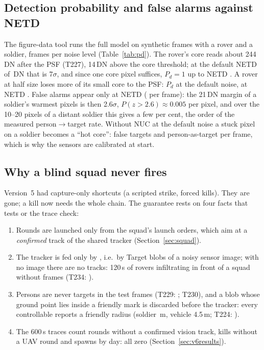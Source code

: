 \subsection{Detection probability and false alarms against NETD}
The figure-data tool runs the full model on synthetic frames with a rover and a soldier, \cvFrames{} frames per noise level (Table~\ref{tab:pd}). The rover's core reads about 244\,DN after the PSF (T227), 14\,DN above the core threshold; at the default NETD of \snNetdDn\,DN that is 7$\sigma$, and since one core pixel suffices, $P_d=1$ up to NETD \cvNetdWorst. A rover at half size loses more of its small core to the PSF: $P_d$ \cvPdFarNom{} at the default noise, \cvPdFarWorst{} at NETD \cvNetdWorst. False alarms appear only at NETD \cvNetdWorst{} (\cvFalseWorst{} per frame): the 21\,DN margin of a soldier's warmest pixels is then 2.6$\sigma$, $P(z>2.6)\approx0.005$ per pixel, and over the 10--20 pixels of a distant soldier this gives a few per cent, the order of the measured person$\to$target rate. Without NUC at the default noise a stuck pixel on a soldier becomes a ``hot core'': \cvNoNucFalse{} false targets and \cvNoNucPerson{} person-as-target per frame, which is why the sensors are calibrated at start.
\begin{table}[h]
\centering\small
\caption{Detection statistics against NETD (generated from , \cvFrames{} frames per row, after NUC except the last row).}\label{tab:pd}
\tabPd
\end{table}

\subsection{Why a blind squad never fires}
Version~5 had capture-only shortcuts (a scripted strike, forced kills). They are gone; a kill now needs the whole chain. The guarantee rests on four facts that tests or the trace check:
\begin{enumerate}
\item Rounds are launched only from the squad's launch orders, which aim at a \emph{confirmed} track of the shared tracker (Section~\ref{sec:squad}).
\item The tracker is fed only by , i.e.\ by Target blobs of a noisy sensor image; with no image there are no tracks: 120\,s of rovers infiltrating in front of a squad without frames (T234: ).
\item Persons are never targets in the test frames (T229: ; T230), and a blob whose ground point lies inside a friendly mark is discarded before the tracker: every controllable reports a friendly radius (soldier \soldierFriendly\,m, vehicle 4.5\,m; T224: ).
\item The 600\,s traces count rounds without a confirmed vision track, kills without a UAV round and spawns by day: all zero (Section~\ref{sec:v6results}).
\end{enumerate}
